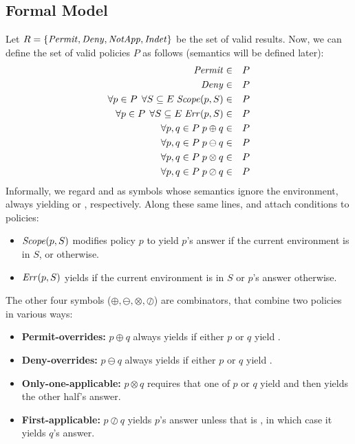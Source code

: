 \subsection{Formal Model}
\label{sec:formal-model}

Let $R = \{ \text{\textit{Permit}}, \text{\textit{Deny}}, \text{\textit{NotApp}}, \text{\textit{Indet}} \}$ be the set
of valid results.  Now, we can define the set of valid policies $P$ as
follows (semantics will be defined later):
\begin{eqnarray*}
  \text{\textit{Permit}} & \in & P \\
  \text{\textit{Deny}} & \in & P \\
  \forall p \in P \;\, \forall S \subseteq E \; \text{\textit{Scope}} (p, S) & \in & P \\
  \forall p \in P \;\, \forall S \subseteq E \; \text{\textit{Err}} (p, S) & \in & P \\
  \forall p, q \in P \; p \oplus q & \in & P \\
  \forall p, q \in P \; p \ominus q & \in & P \\
  \forall p, q \in P \; p \otimes q & \in & P \\
  \forall p, q \in P \; p \oslash q & \in & P
\end{eqnarray*}
Informally, we regard \Permit{} and \Deny{} as symbols whose semantics
ignore the environment, always yielding \Permit{} or \Deny{},
respectively.  Along these same lines, \Scope{} and \Err{} attach
conditions to policies:
\begin{itemize}
\item $\text{\textit{Scope}} (p, S)$ modifies policy $p$ to yield $p$'s
answer if the current environment is in $S$, or \NotApplicable{}
otherwise.
\item $\text{\textit{Err}} (p, S)$ yields \Indeterminate{} if 
the current environment is in $S$ or $p$'s answer otherwise.  
\end{itemize}
The other four
symbols ($\oplus, \ominus, \otimes, \oslash$) are combinators, that
combine two policies in various ways:
\begin{itemize}
\item {\bf Permit-overrides:} $p \oplus q$ always yields
\Permit{} if either $p$ or $q$ yield \Permit{}.
\item  {\bf Deny-overrides:} $p \ominus q$ always
yields \Deny{} if either $p$ or $q$ yield \Deny{}.
\item  {\bf Only-one-applicable:} $p \otimes q$ requires that
one of $p$ or $q$ yield \NotApplicable{} and then yields the other
half's answer.
\item {\bf First-applicable:} $p \oslash q$ yields $p$'s answer unless that is
\NotApplicable{}, in which case it yields $q$'s answer.
\end{itemize}

